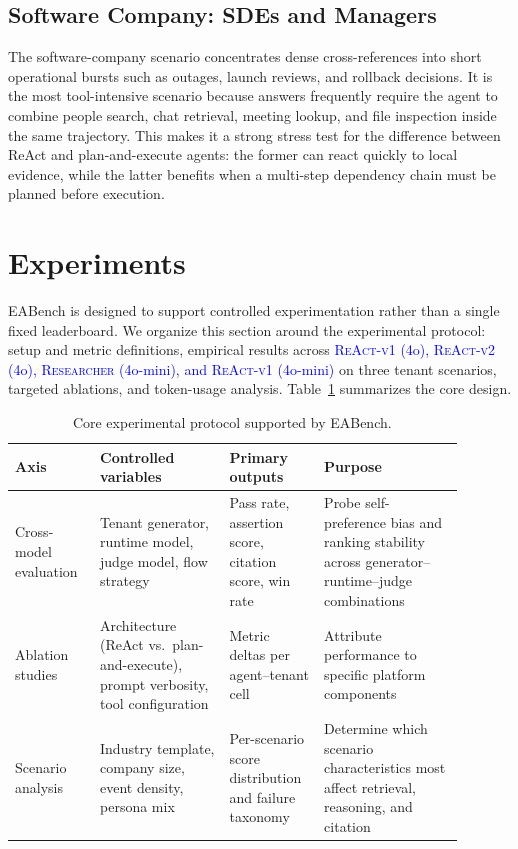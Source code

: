 \documentclass[journal,dvipsnames]{acmart}
\begin{document}
\subsection{Software Company: SDEs and Managers}
The software-company scenario concentrates dense cross-references into short operational bursts such as outages, launch reviews, and rollback decisions. It is the most tool-intensive scenario because answers frequently require the agent to combine people search, chat retrieval, meeting lookup, and file inspection inside the same trajectory. This makes it a strong stress test for the difference between ReAct and plan-and-execute agents: the former can react quickly to local evidence, while the latter benefits when a multi-step dependency chain must be planned before execution.




\section{Experiments}
\label{sec:experiments}

EABench is designed to support controlled experimentation rather than a single fixed leaderboard. We organize this section around the experimental protocol: setup and metric definitions, empirical results across \textcolor{blue}{\textsc{ReAct-v1} (4o), \textsc{ReAct-v2} (4o), \textsc{Researcher} (4o-mini), and \textsc{ReAct-v1} (4o-mini)} on three tenant scenarios, targeted ablations, and token-usage analysis. Table~\ref{tab:exp_matrix} summarizes the core design.

\begin{table}[h]
\centering
\caption{Core experimental protocol supported by EABench.}
\label{tab:exp_matrix}
\small
\begin{tabular}{p{0.17\linewidth}p{0.26\linewidth}p{0.18\linewidth}p{0.28\linewidth}}
\toprule
\textbf{Axis} & \textbf{Controlled variables} & \textbf{Primary outputs} & \textbf{Purpose} \\
\midrule
Cross-model evaluation & Tenant generator, runtime model, judge model, flow strategy & Pass rate, assertion score, citation score, win rate & Probe self-preference bias and ranking stability across generator--runtime--judge combinations \\
Ablation studies & Architecture (ReAct vs.\ plan-and-execute), prompt verbosity, tool configuration & Metric deltas per agent--tenant cell & Attribute performance to specific platform components \\
Scenario analysis & Industry template, company size, event density, persona mix & Per-scenario score distribution and failure taxonomy & Determine which scenario characteristics most affect retrieval, reasoning, and citation \\
\bottomrule
\end{tabular}
\end{table}
\end{document}
